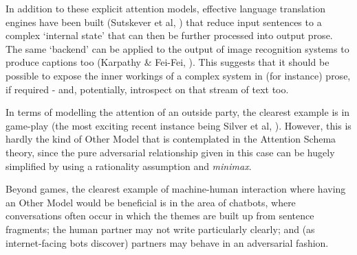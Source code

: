 \documentclass[citeauthoryear]{llncs}
\begin{document}



In addition to these explicit attention models, effective language translation
engines have been built (Sutskever et al, \cite{SequenceToSequence}) that reduce
input sentences to a complex `internal state' that can then be further processed into
output prose.  The same `backend' can be applied to the output of image recognition
systems to produce captions too (Karpathy \& Fei-Fei, \cite{karpathy2014deep}).
%
This suggests that it should be possible to expose the inner workings of 
a complex system in (for instance) prose, if required - and, potentially,
introspect on that stream of text too.




In terms of modelling the attention of an outside party, the clearest 
example is in game-play (the most exciting recent instance being Silver et al, \cite{AlphaGo}).
%
However, this is hardly the kind of Other Model that is contemplated in
the Attention Schema theory, since the pure adversarial relationship given in 
this case can be hugely simplified by using a rationality assumption and \emph{minimax}.








Beyond games, the clearest example of machine-human interaction where having an Other Model
would be beneficial is in the area of chatbots, where conversations often occur in which the 
themes are built up from sentence fragments; the human partner may not
write particularly clearly; and (as internet-facing bots discover) partners
may behave in an adversarial fashion.
\end{document}
